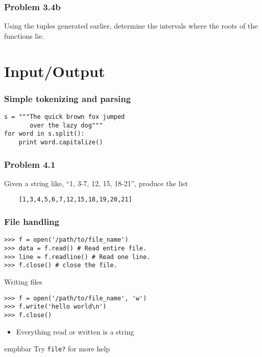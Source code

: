 \documentclass[14pt,compress]{beamer}
\newcommand{\emphbar}[1]
{\begin{beamercolorbox}[rounded=true]{emphbar} 
      {#1}
 \end{beamercolorbox}
}
\newcounter{time}
\newcommand{\inctime}[1]{\addtocounter{time}{#1}{\tiny \thetime\ m}}
\newcommand{\typ}[1]{\texttt{#1}}
\begin{document}
\begin{frame}[fragile]
  \frametitle{Problem 3.4b}

  Using the tuples generated earlier, determine the intervals where the roots of the functions lie.

  \inctime{15}
\end{frame}


\section{Input/Output}

\begin{frame}[fragile]
  \frametitle{Simple tokenizing and parsing}
  \begin{lstlisting}
s = """The quick brown fox jumped
       over the lazy dog"""
for word in s.split():
    print word.capitalize()
  \end{lstlisting}
\end{frame}

\begin{frame}[fragile]
  \frametitle{Problem 4.1}
  Given a string like, ``1, 3-7, 12, 15, 18-21'', produce the list \\
  \begin{lstlisting}
    [1,3,4,5,6,7,12,15,18,19,20,21]
  \end{lstlisting}
\end{frame}

\begin{frame}[fragile]
  \frametitle{File handling}
\begin{lstlisting}
>>> f = open('/path/to/file_name')
>>> data = f.read() # Read entire file.
>>> line = f.readline() # Read one line.
>>> f.close() # close the file.
\end{lstlisting}
Writing files
\begin{lstlisting}
>>> f = open('/path/to/file_name', 'w')
>>> f.write('hello world\n')
>>> f.close()
\end{lstlisting}
\begin{itemize}
    \item Everything read or written is a string
\end{itemize}
\emphbar{Try \typ{file?} for more help}
\end{frame}
\end{document}
